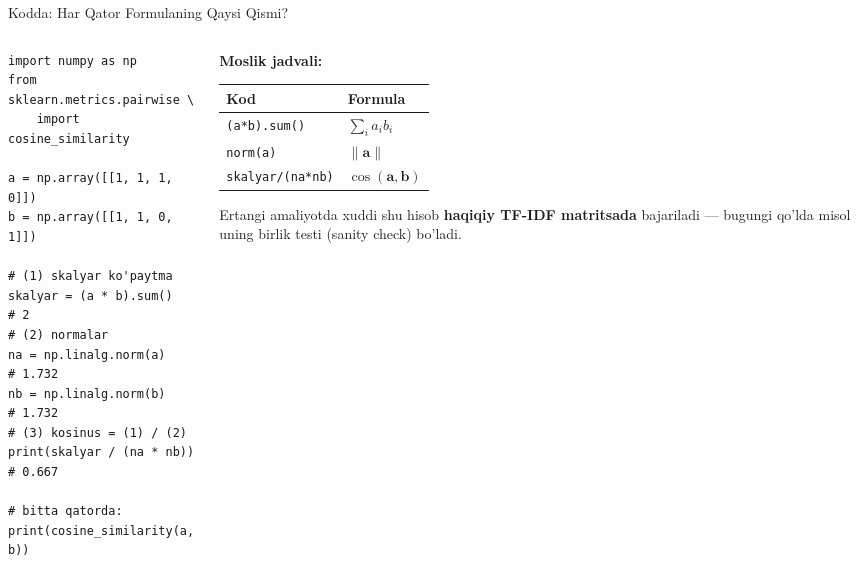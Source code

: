 \documentclass[aspectratio=169,11pt]{beamer}
\begin{document}
\begin{frame}[fragile]{Kodda: Har Qator Formulaning Qaysi Qismi?}
  \begin{columns}
    \begin{column}{0.52\textwidth}
      \begin{lstlisting}
import numpy as np
from sklearn.metrics.pairwise \
    import cosine_similarity

a = np.array([[1, 1, 1, 0]])
b = np.array([[1, 1, 0, 1]])

# (1) skalyar ko'paytma
skalyar = (a * b).sum()      # 2
# (2) normalar
na = np.linalg.norm(a)       # 1.732
nb = np.linalg.norm(b)       # 1.732
# (3) kosinus = (1) / (2)
print(skalyar / (na * nb))   # 0.667

# bitta qatorda:
print(cosine_similarity(a, b))
      \end{lstlisting}
    \end{column}
    \begin{column}{0.44\textwidth}
      \textbf{Moslik jadvali:}
      \vspace{0.2em}
      \begin{center}\scriptsize
      \begin{tabular}{ll}
        \toprule
        \textbf{Kod} & \textbf{Formula} \\
        \midrule
        \texttt{(a*b).sum()} & $\sum_i a_i b_i$ \\
        \texttt{norm(a)} & $\lVert\mathbf{a}\rVert$ \\
        \texttt{skalyar/(na*nb)} & $\cos(\mathbf{a},\mathbf{b})$ \\
        \bottomrule
      \end{tabular}
      \end{center}
      \vspace{0.3em}
      \begin{tcolorbox}[okbox]
        \small Ertangi amaliyotda xuddi shu hisob \textbf{haqiqiy
        TF-IDF matritsada} bajariladi --- bugungi qo'lda misol
        uning birlik testi (sanity check) bo'ladi.
      \end{tcolorbox}
    \end{column}
  \end{columns}
\end{frame}
\end{document}
